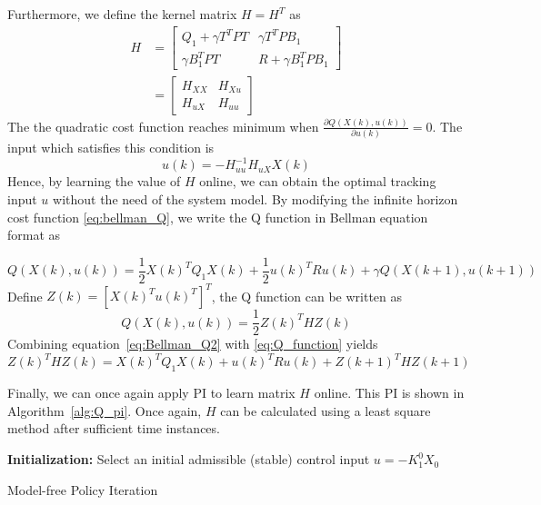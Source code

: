 Furthermore, we define the kernel matrix $H = H^T$ as
\begin{equation}
\begin{split}
H &=  \left[\begin{array}{cc}
Q_1+\gamma T^TPT & \gamma T^TPB_1 \\ 
\gamma B_1^TPT & R+\gamma B_1^TPB_1
\end{array}  \right] \\
&=\left[ \begin{array}{cc}
H_{XX} & H_{Xu} \\ 
H_{uX} & H_{uu}
\end{array} \right] 
\end{split}
\end{equation}
The the quadratic cost function reaches minimum when $ \frac{\partial Q(X(k), u(k))}{\partial u(k)} = 0 $. The input which satisfies this condition is
\begin{equation}
u(k) = -H_{uu}^{-1}H_{uX}X(k)
\end{equation}
Hence, by learning the value of $H$ online, we can obtain the optimal tracking input $u$ without the need of the system model. By modifying the infinite horizon cost function \eqref{eq:bellman_Q}, we write the Q function in Bellman equation format as

\begin{equation}
Q(X(k), u(k)) = \frac{1}{2}X(k)^TQ_1X(k) + \frac{1}{2}u(k)^TRu(k) + \gamma Q(X(k+1), u(k+1))
\label{eq:Bellman_Q2}
\end{equation}
Define $Z(k) = \left[ X(k)^T u(k)^T\right]^T$, the Q function can be written as
\begin{equation}
Q(X(k),u(k)) = \frac{1}{2}Z(k)^THZ(k)
\label{eq:Q_function}
\end{equation}
Combining equation~\eqref{eq:Bellman_Q2} with \eqref{eq:Q_function} yields
\begin{equation}
Z(k)^THZ(k) = X(k)^TQ_1X(k) + u(k)^TRu(k) + Z(k+1)^THZ(k+1)
\end{equation}

Finally, we can once again apply \ac {PI} to learn matrix $H$ online. This \ac {PI} is shown in Algorithm~\ref{alg:Q_pi}. Once again, $H$ can be calculated using a least square method after sufficient time instances.

\begin{algorithm}[H]
	\textbf{Initialization:} Select an initial admissible (stable) control input $u = -K^0_1X_0$\\
	\label{alg:Q_pi}
	\caption{Model-free Policy Iteration}
\end{algorithm}


